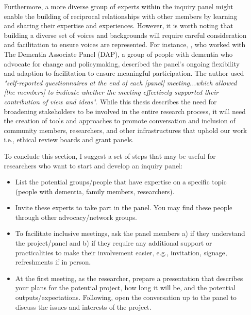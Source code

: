 Furthermore, a more diverse group of experts within the inquiry panel might enable the building of reciprocal relationships with other members by learning and sharing their expertise and experiences. However, it is worth noting that building a diverse set of voices and backgrounds will require careful consideration and facilitation to ensure voices are represented. For instance, \cite{innes2021s}, who worked with The Dementia Associate Panel (DAP), a group of people with dementia who advocate for change and policymaking, described the panel's ongoing flexibility and adaption to facilitation to ensure meaningful participation. The author used \textit{"self-reported questionnaires at the end of each [panel] meeting...which allowed [the members] to indicate whether the meeting effectively supported their contribution of view and ideas"}. While this thesis describes the need for broadening stakeholders to be involved in the entire research process, it will need the creation of tools and approaches to promote conversation and inclusion of community members, researchers, and other infrastructures that uphold our work i.e., ethical review boards and grant panels. 

To conclude this section, I suggest a set of steps that may be useful for researchers who want to start and develop an inquiry panel:

\begin{itemize}
    \item List the potential groups/people that have expertise on a specific topic (people with dementia, family members, researchers).
    \item Invite these experts to take part in the panel. You may find these people through other advocacy/network groups.
    \item To facilitate inclusive meetings, ask the panel members a) if they understand the project/panel and b) if they require any additional support or practicalities to make their involvement easier, e.g., invitation, signage, refreshments if in person.
    \item At the first meeting, as the researcher, prepare a presentation that describes your plans for the potential project, how long it will be, and the potential outputs/expectations. Following, open the conversation up to the panel to discuss the issues and interests of the project.
\end{itemize}

